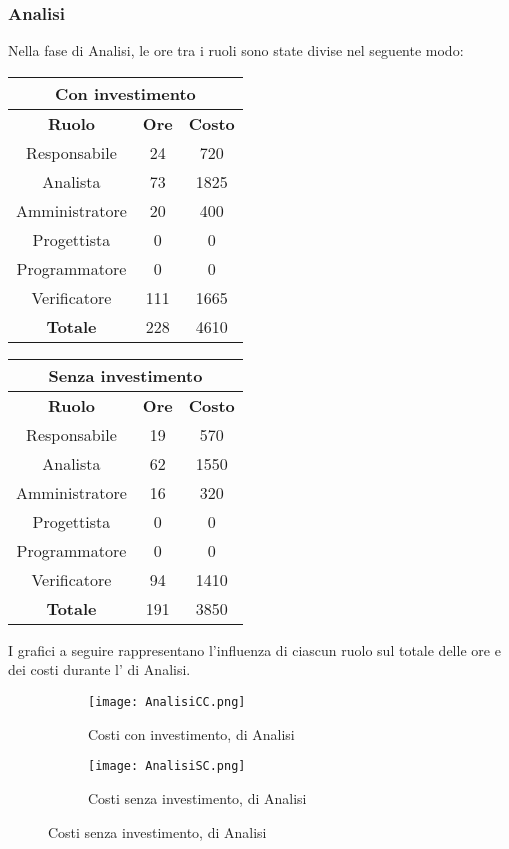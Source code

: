 \documentclass{scalatekids-article}
\begin{document}
\subsubsection{Analisi}
Nella fase di Analisi, le ore tra i ruoli sono state divise nel seguente modo:
\begin{center}
  \normalsize
  \begin{tabular}{| c | c | c |}
    \hline
    \multicolumn{3}{|c|}{\textbf{Con investimento}}\\
    \hline
    \textbf{Ruolo} & \textbf{Ore} & \textbf{Costo}\\
    \hline
    Responsabile & 24 & 720\\
    Analista & 73 & 1825\\
    Amministratore & 20 & 400\\
    Progettista & 0 & 0\\
    Programmatore & 0 & 0\\
    Verificatore & 111 & 1665 \\
    \hline
    \textbf{Totale} & 228 & 4610\\
    \hline
  \end{tabular}
  \qquad
  \begin{tabular}{| c | c | c |}
    \hline
    \multicolumn{3}{|c|}{\textbf{Senza investimento}}\\
    \hline
    \textbf{Ruolo} & \textbf{Ore} & \textbf{Costo}\\
    \hline
    Responsabile & 19 & 570\\
    Analista & 62 & 1550\\
    Amministratore & 16 & 320\\
    Progettista & 0 & 0\\
    Programmatore & 0 & 0\\
    Verificatore & 94 & 1410 \\
    \hline
    \textbf{Totale} & 191 & 3850\\
    \hline
  \end{tabular}
\end{center}
I grafici a seguire rappresentano l'influenza di ciascun ruolo sul totale delle ore e dei costi durante l' di Analisi.
\begin{figure}[H]
  \begin{subfigure}[H]{0.47\textwidth}
    \texttt{[image: AnalisiCC.png]}
    \caption{Costi con investimento,  di Analisi}
  \end{subfigure}
  \qquad
  \begin{subfigure}[H]{0.47\textwidth}
    \texttt{[image: AnalisiSC.png]}
    \caption{Costi senza investimento,  di Analisi}
  \end{subfigure}
\end{figure}
\newpage
\end{document}
